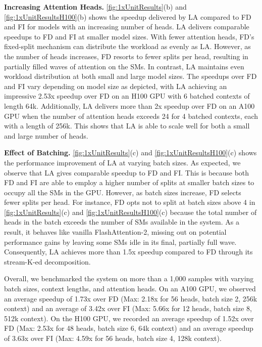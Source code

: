 {{{{{\textbf{Increasing Attention Heads.}} \autoref{fig:1xUnitResults}(b) and \autoref{fig:1xUnitResultsH100}(b) shows the speedup delivered by LA compared to FD and FI for models with an increasing number of heads. LA delivers comparable speedups to FD and FI at smaller model sizes. With fewer attention heads, FD’s fixed-split mechanism can distribute the workload as evenly as LA. However, as the number of heads increases, FD resorts to fewer splits per head, resulting in partially filled waves of attention on the SMs. In contrast, LA maintains even workload distribution at both small and large model sizes. The speedups over FD and FI vary depending on model size as depicted, with LA achieving an impressive 2.53x speedup over FD on an H100 GPU with 6 batched contexts of length 64k. Additionally, LA delivers more than 2x speedup over FD on an A100 GPU when the number of attention heads exceeds 24 for 4 batched contexts, each with a length of 256k. This shows that LA is able to scale well for both a small and large number of heads.

{\textbf{Effect of Batching.}} \autoref{fig:1xUnitResults}(c) and \autoref{fig:1xUnitResultsH100}(c) shows the performance improvement of LA at varying batch sizes. As expected, we observe that LA gives comparable speedup to FD and FI. This is because both FD and FI are able to employ a higher number of splits at smaller batch sizes to occupy all the SMs in the GPU. However, as batch sizes increase, FD selects fewer splits per head. For instance, FD opts not to split at batch sizes above 4 in \autoref{fig:1xUnitResults}(c) and \autoref{fig:1xUnitResultsH100}(c) because the total number of heads in the batch exceeds the number of SMs available in the system. As a result, it behaves like vanilla FlashAttention-2, missing out on potential performance gains by leaving some SMs idle in its final, partially full wave. Consequently, LA achieves more than 1.5x speedup compared to FD through its stream-K-ed decomposition. 

Overall, we benchmarked the system on more than a 1,000 samples with varying batch sizes, context lengths, and attention heads. On an A100 GPU, we observed an average speedup of 1.73x over FD (Max: 2.18x for 56 heads, batch size 2, 256k context) and an average of 3.42x over FI (Max: 5.66x for 12 heads, batch size 8, 512k context). On the H100 GPU, we recorded an average speedup of 1.52x over FD (Max: 2.53x for 48 heads, batch size 6, 64k context) and an average speedup of 3.63x over FI (Max: 4.59x for 56 heads, batch size 4, 128k context). 

}}}}
